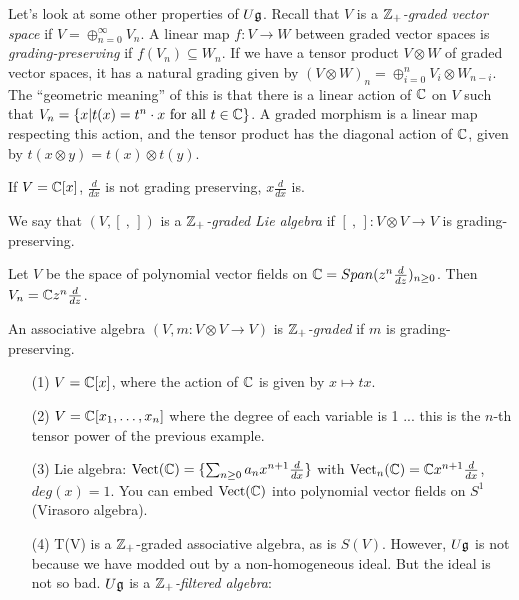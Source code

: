  Let's look at some other properties of $U\mathfrak{g}$.
 Recall that $V$ is a \emph{$\mathbb{Z}_+$-graded vector space} if $V=\oplus_{n=0}^\infty
 V_n$. A linear map $f:V\to W$ between graded vector spaces is
 \emph{grading-preserving} if $f(V_n)\subseteq W_n$. If we have a tensor product
 $V\otimes W$ of graded vector spaces, it has a natural grading given by $(V\otimes
 W)_{n} = \oplus_{i=0}^n V_i\otimes W_{n-i}$. The ``geometric meaning'' of this is
 that there is a linear action of $\mathbb{C}$ on $V$ such that $V_n=\{x|t(x)=t^n\cdot
 x\text{ for all } t\in \mathbb{C}\}$. A graded morphism is a linear map respecting this
 action, and the tensor product has the diagonal action of $\mathbb{C}$, given by $t(x\otimes
 y) = t(x)\otimes t(y)$.
\begin{example} If $V=\mathbb{C}[x]$, $\frac{d}{dx}$ is not grading preserving, $x\frac{d}{dx}$ is.
\end{example}
We say that $(V,[\ ,\,])$ is a \emph{$\mathbb{Z}_+$-graded Lie algebra} if $[\ ,\,]:V\otimes
V\to V$ is grading-preserving.
\begin{example}
  Let $V$ be the space of polynomial vector fields on
  $\mathbb{C}=Span(z^n\frac{d}{dz})_{n\geq 0}$. Then $V_n=\mathbb{C} z^n\frac{d}{dz}$.
\end{example}
 An associative algebra $(V,m:V\otimes V\to V)$ is \emph{$\mathbb{Z}_+$-graded} if $m$ is grading-preserving.
\begin{example}
   \begin{itemize}
   \item[]

   \item[(1)] $V=\mathbb{C}[x]$, where the action of $\mathbb{C}$ is given by $x\mapsto tx$.

   \item[(2)] $V=\mathbb{C}[x_1,\dots, x_n]$ where the degree of each variable is 1 ... this
   is the $n$-th tensor power of the previous example.

   \item[(3)] Lie algebra:
   $\mathrm{Vect}(\mathbb{C}) = \{\sum_{n\ge 0} a_n x^{n+1}\frac{d }{d x}\}$ with
   $\mathrm{Vect}_n(\mathbb{C}) = \mathbb{C} x^{n+1}\frac{d }{d x}$, $deg(x)=1$.  You can embed
   $\mathrm{Vect}(\mathbb{C})$ into polynomial vector fields on $S^1$ (Virasoro algebra).

   \item[(4)] T(V) is a $\mathbb{Z}_+$-graded associative algebra, as is $S(V)$. However,
   $U\mathfrak{g}$ is not because we have modded out by a non-homogeneous ideal. But the ideal
   is not so bad. $U\mathfrak{g}$ is a \emph{$\mathbb{Z}_+$-filtered algebra}:
   \end{itemize}
 \end{example}

